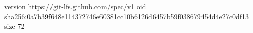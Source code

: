 version https://git-lfs.github.com/spec/v1
oid sha256:0a7b39f648e114372746e60381cc10b6126d6457b59f038679454d4e27c0df13
size 72
